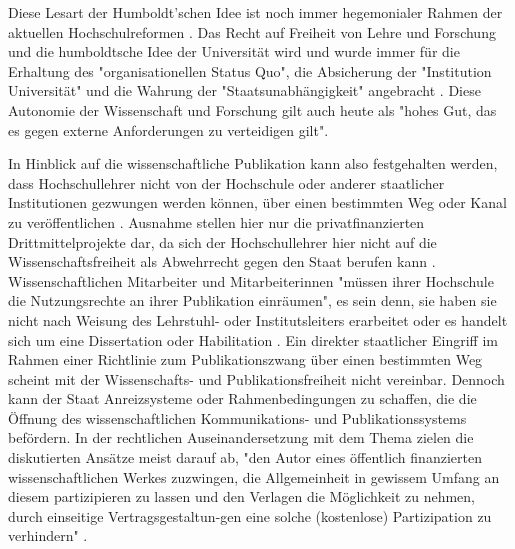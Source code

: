 \begin{enumerate}
\begin{end}
Diese Lesart der Humboldt’schen Idee ist noch immer hegemonialer Rahmen der aktuellen Hochschulreformen \cite{Huber_2005}. Das Recht auf Freiheit von Lehre und Forschung und die humboldtsche Idee der Universität wird und wurde immer für die Erhaltung des "organisationellen Status Quo", die Absicherung der "Institution Universität" und die Wahrung der "Staatsunabhängigkeit" angebracht \cite{Huber_2005}. Diese Autonomie der Wissenschaft und Forschung gilt auch heute als "hohes Gut, das es gegen externe Anforderungen zu verteidigen gilt"\cite{kaldewey_2010}.

In Hinblick auf die wissenschaftliche Publikation kann also festgehalten werden, dass Hochschullehrer nicht von der Hochschule oder anderer staatlicher Institutionen gezwungen werden können, über einen bestimmten Weg oder Kanal zu veröffentlichen \cite{spindler_2006_rechtloa} \cite{dorschel_2006_open}. Ausnahme stellen hier nur die privatfinanzierten Drittmittelprojekte dar, da sich der Hochschullehrer hier nicht auf die Wissenschaftsfreiheit als Abwehrrecht gegen den Staat berufen kann \cite{spindler_2006_rechtloa}. Wissenschaftlichen Mitarbeiter und Mitarbeiterinnen "müssen ihrer Hochschule die Nutzungsrechte an ihrer Publikation einräumen", es sein denn, sie haben sie nicht nach Weisung des Lehrstuhl- oder Institutsleiters erarbeitet oder es handelt sich um eine Dissertation oder Habilitation \cite{spindler_2006_rechtloa}. Ein direkter staatlicher Eingriff im Rahmen einer Richtlinie zum Publikationszwang über einen bestimmten Weg scheint mit der Wissenschafts- und Publikationsfreiheit nicht vereinbar. Dennoch kann der Staat Anreizsysteme oder Rahmenbedingungen zu schaffen, die die Öffnung des wissenschaftlichen Kommunikations- und Publikationssystems befördern. In der rechtlichen Auseinandersetzung mit dem Thema zielen die diskutierten Ansätze meist darauf ab, "den Autor eines öffentlich finanzierten wissenschaftlichen Werkes zuzwingen, die Allgemeinheit in gewissem Umfang an diesem partizipieren zu lassen und den Verlagen die Möglichkeit zu nehmen, durch einseitige Vertragsgestaltun-gen eine solche (kostenlose) Partizipation zu verhindern" \cite{dorschel_2006_open}.


\end{end}
\end{enumerate}
